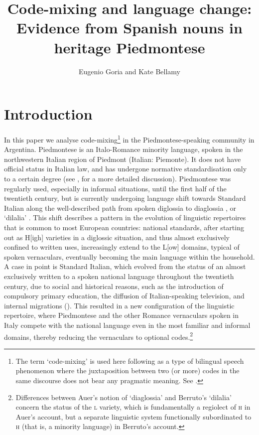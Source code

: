 \documentclass[output=paper]{langscibook}
\author{Eugenio Goria\orcid{}\affiliation{University of Turin} and Kate Bellamy\orcid{}\affiliation{Leiden University}}
\title[Code-mixing and language change]{Code-mixing and language change: Evidence from Spanish nouns in heritage Piedmontese}
\begin{document}
\maketitle 


\section{Introduction}\label{sec:goria:1}

In this paper we analyse code-mixing\footnote{The term ‘code-mixing’ is used here following \citet{Auer1999} as a type of bilingual speech phenomenon where the juxtaposition between two (or more) codes in the same discourse does not bear any pragmatic meaning. See .} in the Piedmontese-speaking community in Argentina. Piedmontese is an Italo-Romance minority language, spoken in the northwestern Italian region of Piedmont (Italian: Piemonte). It does not have official status in Italian law, and has undergone normative standardisation only to a certain degree (see \citealt{Regis2013,RegisRivoirainpress}, for a more detailed discussion). Piedmontese was regularly used, especially in informal situations, until the first half of the twentieth century, but is currently undergoing language shift towards Standard Italian along the well-described path from spoken diglossia to diaglossia \citep{Auer2005}, or ‘dilalia’ \citep{Berruto2012}. This shift describes a pattern in the evolution of linguistic repertoires that is common to most European countries: national standards, after starting out as H[igh] varieties in a diglossic situation, and thus almost exclusively confined to written uses, increasingly extend to the L[ow] domains, typical of spoken vernaculars, eventually becoming the main language within the household. A case in point is Standard Italian, which evolved from the status of an almost exclusively written to a spoken national language throughout the twentieth century, due to social and historical reasons, such as the introduction of compulsory primary education, the diffusion of Italian-speaking television, and internal migrations (\citealt{Mauro1963}). This resulted in a new configuration of the linguistic repertoire, where Piedmontese and the other Romance vernaculars spoken in Italy compete with the national language even in the most familiar and informal domains, thereby reducing the vernaculars to optional codes.\footnote{Differences between Auer’s notion of ‘diaglossia’ and Berruto’s ‘dilalia’ concern the status of the \textsc{l} variety, which is fundamentally a regiolect of \textsc{h} in Auer’s account, but a separate linguistic system functionally subordinated to \textsc{h} (that is, a minority language) in Berruto’s account.}
\end{document}
